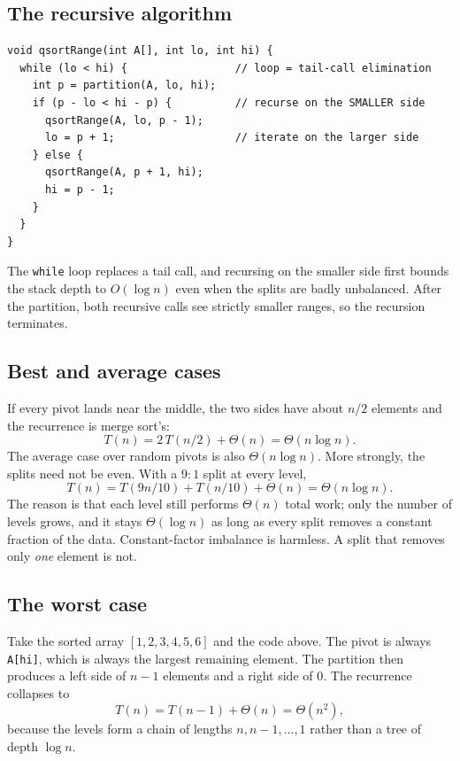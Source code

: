 \documentclass[11pt]{article}
\begin{document}
\subsection{The recursive algorithm}

\begin{verbatim}
void qsortRange(int A[], int lo, int hi) {
  while (lo < hi) {                 // loop = tail-call elimination
    int p = partition(A, lo, hi);
    if (p - lo < hi - p) {          // recurse on the SMALLER side
      qsortRange(A, lo, p - 1);
      lo = p + 1;                   // iterate on the larger side
    } else {
      qsortRange(A, p + 1, hi);
      hi = p - 1;
    }
  }
}
\end{verbatim}

The \texttt{while} loop replaces a tail call, and recursing on the smaller side first bounds the stack depth to $O(\log n)$ even when the splits are badly unbalanced. After the partition, both recursive calls see strictly smaller ranges, so the recursion terminates.

\subsection{Best and average cases}

If every pivot lands near the middle, the two sides have about $n/2$ elements and the recurrence is merge sort's:
\[
  T(n) = 2\,T(n/2) + \Theta(n) = \Theta(n\log n).
\]
The average case over random pivots is also $\Theta(n\log n)$. More strongly, the splits need not be even. With a $9{:}1$ split at every level,
\[
  T(n) = T(9n/10) + T(n/10) + \Theta(n) = \Theta(n\log n).
\]
The reason is that each level still performs $\Theta(n)$ total work; only the number of levels grows, and it stays $\Theta(\log n)$ as long as every split removes a constant fraction of the data. Constant-factor imbalance is harmless. A split that removes only \emph{one} element is not.

\subsection{The worst case}

Take the sorted array $[1,2,3,4,5,6]$ and the code above. The pivot is always \texttt{A[hi]}, which is always the largest remaining element. The partition then produces a left side of $n-1$ elements and a right side of $0$. The recurrence collapses to
\[
  T(n) = T(n-1) + \Theta(n) = \Theta(n^2),
\]
because the levels form a chain of lengths $n, n-1, \dots, 1$ rather than a tree of depth $\log n$.
\end{document}
